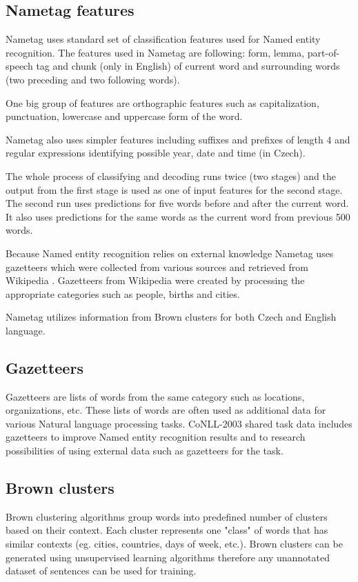 \documentclass[thesis=B,english]{FITthesis}[2012/10/20]
\begin{document}
\subsection{Nametag features}
\par Nametag uses standard set of classification features used for Named entity recognition. The features used in Nametag are following: form, lemma, part-of-speech tag and chunk (only in English) of current word and surrounding words (two preceding and two following words). 
\par One big group of features are orthographic features such as capitalization, punctuation, lowercase and uppercase form of the word.
\par Nametag also uses simpler features including suffixes and prefixes of length 4 and regular expressions identifying possible year, date and time (in Czech).
\par The whole process of classifying and decoding runs twice (two stages) and the output from the first stage is used as one of input features for the second stage. The second run uses predictions for five words before and after the current word. It also uses predictions for the same words as the current word from previous 500 words. 
\par Because Named entity recognition relies on external knowledge Nametag uses gazetteers which were collected from various sources and retrieved from Wikipedia \cite{wikipedia}. Gazetteers from Wikipedia were created by processing the appropriate categories such as people, births and cities.
\par Nametag utilizes information from Brown clusters for both Czech and English language. 

\subsection{Gazetteers}
Gazetteers are lists of words from the same category such as locations, organizations, etc. These lists of words are often used as additional data for various Natural language processing tasks. CoNLL-2003 shared task data includes gazetteers to improve Named entity recognition results and to research possibilities of using external data such as gazetteers for the task.

\subsection{Brown clusters}
Brown clustering algorithms group words into predefined number of clusters based on their context. Each cluster represents one "class" of words that has similar contexts (eg. cities, countries, days of week, etc.). Brown clusters can be generated using unsupervised learning algorithms therefore any unannotated dataset of sentences can be used for training.
\end{document}
